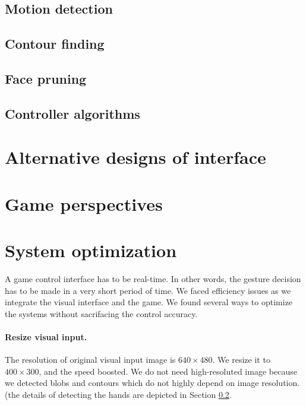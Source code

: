 \documentclass[10pt,twocolumn,letterpaper]{article}
\begin{document}
\subsection{Motion detection}

\subsection{Contour finding}
\label{sec:contour}

\subsection{Face pruning}
\label{sec:face}

\subsection{Controller algorithms}

\section{Alternative designs of interface}

\section{Game perspectives}

\section{System optimization}
A game control interface has to be real-time. In other words, 
the gesture decision has to be made in a very short period of time. 
We faced efficiency issues as we integrate the visual interface and 
the game. We found several ways to optimize the systems without 
sacrifacing the control accuracy.

\paragraph{Resize visual input.} The resolution of 
original visual input image is $640 \times 480$. 
We resize it to $400 \times 300$, and the speed boosted.
We do not need high-resoluted image because we detected 
blobs and contours which do not highly depend on image resolution. 
(the details of detecting the hands are depicted in Section 
\ref{sec:contour}.
\end{document}
